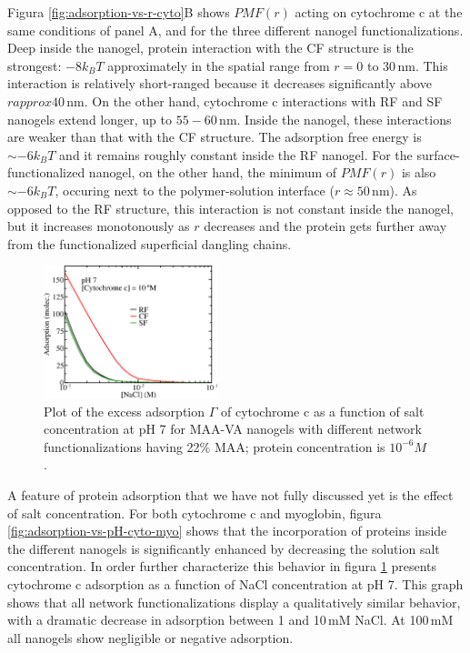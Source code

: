 Figura \ref{fig:adsorption-vs-r-cyto}B shows ${PMF}(r)$ acting on cytochrome c at the same conditions of panel A, and for the three different nanogel functionalizations.
Deep inside the nanogel, protein interaction with the CF structure is the strongest: $-8k_B T$ approximately in the spatial range from $r=0$ to 30\,nm.
This interaction is relatively short-ranged because it decreases significantly above $r approx 40$\,nm.
On the other hand,  cytochrome c interactions with RF and SF nanogels extend longer, up to $55-60$\,nm.
Inside the nanogel, these interactions are weaker than that with the CF structure.
The adsorption free energy is $\sim -6 k_BT$ and it remains roughly constant inside the RF nanogel.
For the surface-functionalized nanogel, on the other hand, the minimum of ${PMF}(r)$ is also $\sim -6 k_BT$, occuring next to the polymer-solution interface ($r\approx 50$\,nm).
As opposed to the RF structure, this interaction is not constant inside the nanogel, but it increases monotonously as $r$ decreases and the protein gets further away from the functionalized superficial dangling chains.













\begin{figure}
     \centering
     \includegraphics[width=0.45\textwidth]{Figures/graphs-gel2/gamma-salts-cyto.png}
     \caption{Plot of the excess adsorption $\Gamma$ of cytochrome c as a function of salt concentration at pH 7 for MAA-VA nanogels with different network functionalizations having 22\% MAA; protein concentration is $10^{-6}M$.}
     \label{fig:Adsorption-vs-Salt-cyto}
 \end{figure}
 

A feature of protein adsorption that we have not fully discussed yet is the effect of salt concentration.
For both cytochrome c and myoglobin, figura \ref{fig:adsorption-vs-pH-cyto-myo} shows that the incorporation of proteins inside the different nanogels is significantly enhanced by decreasing the solution salt concentration.
In order further characterize this behavior in  figura \ref{fig:Adsorption-vs-Salt-cyto} presents cytochrome c adsorption as a function of NaCl concentration at pH 7. 
This graph shows that all network functionalizations display a qualitatively similar behavior, with a dramatic decrease in adsorption between 1 and 10\,mM NaCl.
At 100\,mM all nanogels show negligible or negative adsorption.

